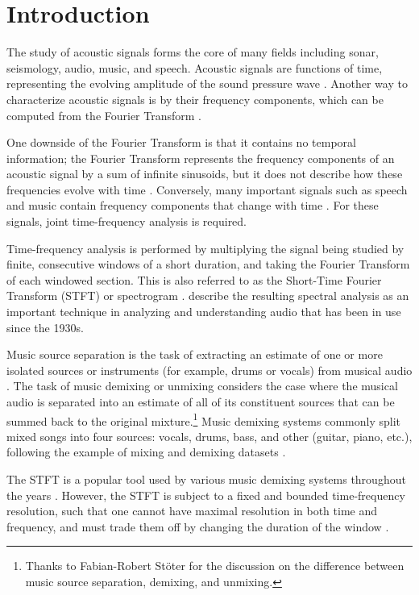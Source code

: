 \documentclass[report.tex]{subfiles}
\begin{document}
\section{Introduction}
\label{ch:intro}

The study of acoustic signals forms the core of many fields including sonar, seismology, audio, music, and speech. Acoustic signals are functions of time, representing the evolving amplitude of the sound pressure wave \parencite{melbook}. Another way to characterize acoustic signals is by their frequency components, which can be computed from the Fourier Transform \parencite{melbook}.

One downside of the Fourier Transform is that it contains no temporal information; the Fourier Transform represents the frequency components of an acoustic signal by a sum of infinite sinusoids, but it does not describe how these frequencies evolve with time \parencite{gabordiagrams}. Conversely, many important signals such as speech and music contain frequency components that change with time \parencite{gabor1946}. For these signals, joint time-frequency analysis is required.

Time-frequency analysis is performed by multiplying the signal being studied by finite, consecutive windows of a short duration, and taking the Fourier Transform of each windowed section. This is also referred to as the Short-Time Fourier Transform (STFT) or spectrogram \parencite{melbook}. \textcite{melbook} describe the resulting spectral analysis as an important technique in analyzing and understanding audio that has been in use since the 1930s.

Music source separation is the task of extracting an estimate of one or more isolated sources or instruments (for example, drums or vocals) from musical audio \parencite{musicsepgood, musicmask}. The task of music demixing or unmixing considers the case where the musical audio is separated into an estimate of all of its constituent sources that can be summed back to the original mixture.\footnote{Thanks to Fabian-Robert St{\"o}ter for the discussion on the difference between music source separation, demixing, and unmixing.} Music demixing systems commonly split mixed songs into four sources: vocals, drums, bass, and other (guitar, piano, etc.), following the example of mixing and demixing datasets \parencite{sisec2016, otherdataset2, musdb18, musdb18hq}.

The STFT is a popular tool used by various music demixing systems throughout the years \parencite{musicsepgood, musicmask, sisec2018, fitzgerald1, umx, plumbley1, plumbley2}. However, the STFT is subject to a fixed and bounded time-frequency resolution, such that one cannot have maximal resolution in both time and frequency, and must trade them off by changing the duration of the window \parencite{gabor1946, gabordiagrams}.
\end{document}
